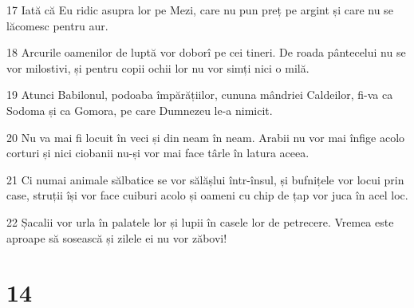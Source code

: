 \par 17 Iată că Eu ridic asupra lor pe Mezi, care nu pun preț pe argint și care nu se lăcomesc pentru aur.
\par 18 Arcurile oamenilor de luptă vor doborî pe cei tineri. De roada pântecelui nu se vor milostivi, și pentru copii ochii lor nu vor simți nici o milă.
\par 19 Atunci Babilonul, podoaba împărățiilor, cununa mândriei Caldeilor, fi-va ca Sodoma și ca Gomora, pe care Dumnezeu le-a nimicit.
\par 20 Nu va mai fi locuit în veci și din neam în neam. Arabii nu vor mai înfige acolo corturi și nici ciobanii nu-și vor mai face târle în latura aceea.
\par 21 Ci numai animale sălbatice se vor sălășlui într-însul, și bufnițele vor locui prin case, struții își vor face cuiburi acolo și oameni cu chip de țap vor juca în acel loc.
\par 22 Șacalii vor urla în palatele lor și lupii în casele lor de petrecere. Vremea este aproape să sosească și zilele ei nu vor zăbovi!

\chapter{14}

